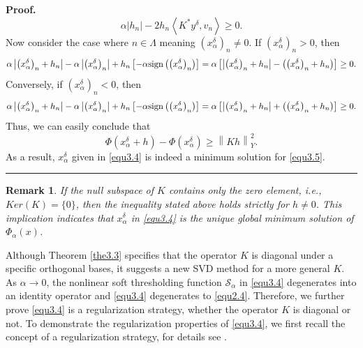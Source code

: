 \documentclass[a4paper,12pt]{article}
\newtheorem{remark}[theorem]{Remark}
\numberwithin{equation}{section}
\newenvironment{proof}[1][Proof]{\textbf{#1.} }
{\ \rule{0.75em}{0.75em}\smallskip}
\begin{document}
\begin{proof}
    \begin{equation*}
        \alpha|h_{n}|-2h_{n}\left<K^{*}y^{\delta},v_{n}\right>\geq 0.
    \end{equation*}
    Now consider the case where $n\in\Lambda$ meaning $\left(x_{\alpha}^{\delta}\right)_{n}\neq 0$. If $\left(x_{\alpha}^{\delta}\right)_{n}>0$, then
    \begin{equation*}
        \alpha\left|\left(x_{\alpha}^{\delta}\right)_{n}+h_{n}\right|- \alpha\left|\left(x_{\alpha}^{\delta}\right)_{n}\right|+h_{n}\left[-\alpha{\rm sign}\left(\left(x_{\alpha}^{\delta}\right)_{n}\right)\right] =\alpha\left[\left|\left(x_{\alpha}^{\delta}\right)_{n}+h_{n}\right|- \left(\left(x_{\alpha}^{\delta}\right)_{n}+h_{n}\right)\right]\geq 0.
    \end{equation*}
    Conversely, if $\left(x_{\alpha}^{\delta}\right)_{n}<0$, then
    \begin{equation*}
        \alpha\left|\left(x_{\alpha}^{\delta}\right)_{n}+h_{n}\right|- \alpha\left|\left(x_{\alpha}^{\delta}\right)_{n}\right|+h_{n}\left[-\alpha{\rm sign}\left(\left(x_{\alpha}^{\delta}\right)_{n}\right)\right] =\alpha\left[\left|\left(x_{\alpha}^{\delta}\right)_{n}+h_{n}\right|+ \left(\left(x_{\alpha}^{\delta}\right)_{n}+h_{n}\right)\right]\geq 0.
    \end{equation*}
    Thus, we can easily conclude that
    \begin{equation*}
        \Phi\left(x_{\alpha}^{\delta}+h\right)-\Phi\left(x_{\alpha}^{\delta}\right) \geq\left\|Kh\right\|_Y^{2}.
    \end{equation*}
    As a result, $x_{\alpha}^{\delta}$ given in \eqref{equ3.4} is indeed a minimum solution for \eqref{equ3.5}. 
\end{proof}

\begin{remark}\label{rem3.3}
If the null subspace of $K$ contains only the zero element, i.e., $Ker(K)=\{0\}$, then the inequality stated above holds strictly for $h\neq 0$. This implication indicates that $x_{\alpha}^{\delta}$ in \eqref{equ3.4} is the unique global minimum solution of $\Phi_{\alpha}(x)$.
\end{remark}  

\par Although Theorem \ref{the3.3} specifies that the operator $K$ is diagonal under a specific orthogonal bases, it suggests a new SVD method for a more general $K$. As $\alpha\rightarrow 0$, the nonlinear soft thresholding function $\mathcal{S}_{\alpha}$ in \eqref{equ3.4} degenerates into an identity operator and \eqref{equ3.4} degenerates to \eqref{equ2.4}. Therefore, we further prove \eqref{equ3.4} is a regularization strategy, whether the operator $K$ is diagonal or not. To demonstrate the regularization properties of \eqref{equ3.4}, we first recall the concept of a regularization strategy, for details see \cite[Chapter 2]{K1996}.
\end{document}
